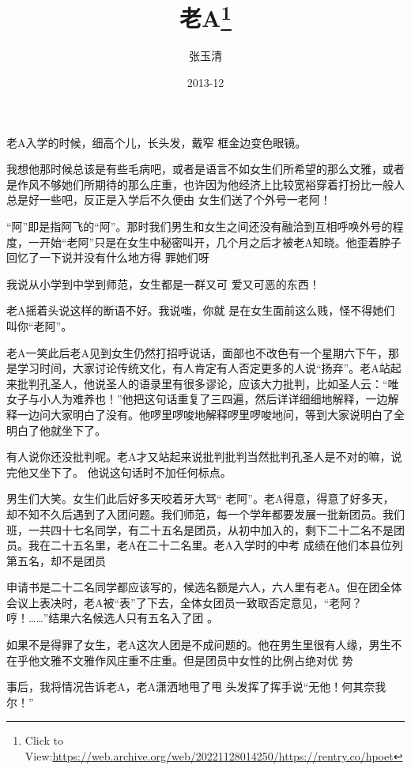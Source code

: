 \documentclass{article}
\title{老A\footnote{Click to View:\url{https://web.archive.org/web/20221128014250/https://rentry.co/hpoet}}}
\author{张玉清}
\date{2013-12}
\begin{document}

\maketitle


\Large

﻿老A入学的时候，细高个儿，长头发，戴窄
框金边变色眼镜。 

我想他那时候总该是有些毛病吧，或者是语言不如女生们所希望的那么文雅，或者是作风不够她们所期待的那么庄重，也许因为他经济上比较宽裕穿着打扮比一般人总是好一些吧，反正是入学后不久便由
女生们送了个外号一老阿！ 

“阿”即是指阿飞的“阿”。那时我们男生和女生之间还没有融洽到互相呼唤外号的程度，一开始“老阿”只是在女生中秘密叫开，几个月之后才被老A知晓。他歪着脖子回忆了一下说并没有什么地方得
罪她们呀 

\newpage

我说从小学到中学到师范，女生都是一群又可
爱又可恶的东西！ 

老A摇着头说这样的断语不好。我说嗤，你就
是在女生面前这么贱，怪不得她们叫你“老阿”。 

老A一笑此后老A见到女生仍然打招呼说话，面部也不改色有一个星期六下午，那是学习时间，大家讨论传统文化，有人肯定有人否定更多的人说“扬弃”。老A站起来批判孔圣人，他说圣人的语录里有很多谬论，应该大力批判，比如圣人云：“唯女子与小人为难养也！”他把这句话重复了三四遍，然后详详细细地解释，一边解释一边问大家明白了没有。他啰里啰唆地解释啰里啰唆地问，等到大家说明白了全
明白了他就坐下了。 

有人说你还没批判呢。老A才又站起来说批判批判当然批判孔圣人是不对的嘛，说完他又坐下了。
他说这句话时不加任何标点。 

男生们大笑。女生们此后好多天咬着牙大骂“
\newpage
老阿”。老A得意，得意了好多天，却不知不久后遇到了入团问题。我们师范，每一个学年都要发展一批新团员。我们班，一共四十七名同学，有二十五名是团员，从初中加入的，剩下二十二名不是团员。我在二十五名里，老A在二十二名里。老A入学时的中考
成绩在他们本县位列第五名，却不是团员 

申请书是二十二名同学都应该写的，候选名额是六人，六人里有老A。但在团全体会议上表决时，老A被“表”了下去，全体女团员一致取否定意见，“老阿？哼！……”结果六名候选人只有五名入了团
。 

如果不是得罪了女生，老A这次人团是不成问题的。他在男生里很有人缘，男生不在乎他文雅不文雅作风庄重不庄重。但是团员中女性的比例占绝对优
势 

事后，我将情况告诉老A，老A潇洒地甩了甩
头发挥了挥手说“无他！何其奈我尔！” 

\newpage
\end{document}
